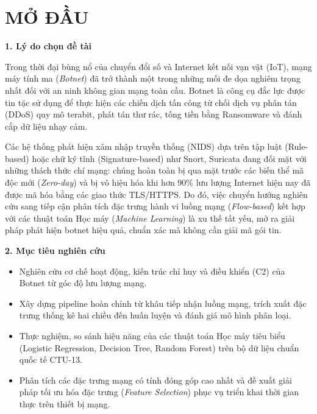 \documentclass[12pt,a4paper,oneside]{report}
\begin{document}
\newpage
\listoftables
{}

\newpage
\listoffigures
{}

\newpage
{}

\chapter*{MỞ ĐẦU}

\textbf{1. Lý do chọn đề tài}

Trong thời đại bùng nổ của chuyển đổi số và Internet kết nối vạn vật (IoT), mạng máy tính ma (\textit{Botnet}) đã trở thành một trong những mối đe dọa nghiêm trọng nhất đối với an ninh không gian mạng toàn cầu. Botnet là công cụ đắc lực được tin tặc sử dụng để thực hiện các chiến dịch tấn công từ chối dịch vụ phân tán (DDoS) quy mô terabit, phát tán thư rác, tống tiền bằng Ransomware và đánh cắp dữ liệu nhạy cảm.

Các hệ thống phát hiện xâm nhập truyền thống (NIDS) dựa trên tập luật (Rule-based) hoặc chữ ký tĩnh (Signature-based) như Snort, Suricata đang đối mặt với những thách thức chí mạng: chúng hoàn toàn bị qua mặt trước các biến thể mã độc mới (\textit{Zero-day}) và bị vô hiệu hóa khi hơn $90\%$ lưu lượng Internet hiện nay đã được mã hóa bằng các giao thức TLS/HTTPS. Do đó, việc chuyển hướng nghiên cứu sang tiếp cận phân tích đặc trưng hành vi luồng mạng (\textit{Flow-based}) kết hợp với các thuật toán Học máy (\textit{Machine Learning}) là xu thế tất yếu, mở ra giải pháp phát hiện botnet hiệu quả, chuẩn xác mà không cần giải mã gói tin.

\textbf{2. Mục tiêu nghiên cứu}
\begin{itemize}
  \item Nghiên cứu cơ chế hoạt động, kiến trúc chỉ huy và điều khiển (C2) của Botnet từ góc độ lưu lượng mạng.
  \item Xây dựng pipeline hoàn chỉnh từ khâu tiếp nhận luồng mạng, trích xuất đặc trưng thống kê hai chiều đến huấn luyện và đánh giá mô hình phân loại.
  \item Thực nghiệm, so sánh hiệu năng của các thuật toán Học máy tiêu biểu (Logistic Regression, Decision Tree, Random Forest) trên bộ dữ liệu chuẩn quốc tế CTU-13.
  \item Phân tích các đặc trưng mạng có tính đóng góp cao nhất và đề xuất giải pháp tối ưu hóa đặc trưng (\textit{Feature Selection}) phục vụ triển khai thời gian thực trên thiết bị mạng.
\end{itemize}
\end{document}
